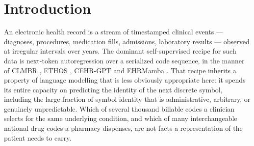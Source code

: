 \documentclass[11pt,a4paper]{article}
\newcommand{\code}[1]{\texttt{\small #1}}
\begin{document}
\begin{abstract}
discrete, low-entropy events, is untested here; a pre-registered comparison on
two continuous hourly-ICU-state datasets, with a decision rule fixed before
training, is specified in Section~\ref{sec:a2} and
\code{docs/experiments/A2\_PLAN.md}. That test has now been run on both
sources, under frozen two-seed probes and under end-to-end fine-tuning: the
two latent objectives with the code loss removed lose to binned AR on all
four tasks, on either source, at either seed and under either readout, so by
the pre-registered decision rule the JEPA framing --- that predicting in
representation space is itself the useful part --- is not supported, and what
the evidence carries is the hybrid as a regularizer riding on a
code-prediction loss, with a short-horizon signature: its one margin outside
the seed spread is on the 6-hour-horizon sepsis task, where fine-tuned it
reaches 0.840 against binned AR's 0.826 and is the only cell in either
fine-tuning grid above \code{gbm} (0.836).
\end{abstract}

\vspace{2mm}

\section{Introduction}

An electronic health record is a stream of timestamped clinical events ---
diagnoses, procedures, medication fills, admissions, laboratory results ---
observed at irregular intervals over years. The dominant self-supervised recipe
for such data is next-token autoregression over a serialized code sequence, in
the manner of CLMBR \citep{ehrshot}, ETHOS \citep{ethos}, CEHR-GPT
\citep{cehrgpt} and EHRMamba \citep{ehrmamba}. That recipe inherits a property
of language modelling that is less obviously appropriate here: it spends its
entire capacity on predicting the identity of the next discrete symbol,
including the large fraction of symbol identity that is administrative,
arbitrary, or genuinely unpredictable. Which of several thousand billable codes
a clinician selects for the same underlying condition, and which of many
interchangeable national drug codes a pharmacy dispenses, are not facts a
representation of the patient needs to carry.
\end{document}
